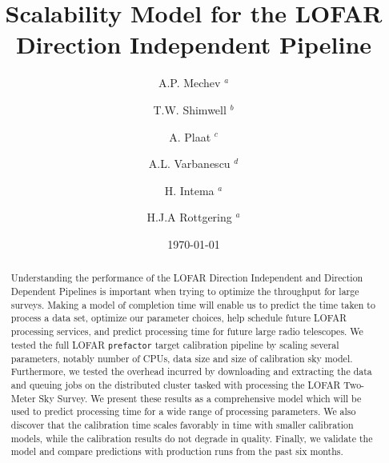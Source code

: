 \documentclass[preprint,5p]{elsarticle}
\begin{document}
\sloppy
{}
\begin{frontmatter}


\title{Scalability Model for the LOFAR Direction Independent Pipeline}%
\author{A.P. Mechev $^a$}

\author{T.W. Shimwell $^b$}%
\author{A. Plaat $^c$}%
\author{A.L. Varbanescu $^d$}
\author{H. Intema $^a$}%
\author{H.J.A Rottgering $^a$}%

\date{\today}%
\address{$^a$ Leiden Observatory, Niels Bohrweg 2, 2333 CA Leiden, the Netherlands}
\address{$^b$ ASTRON, Oude Hoogeveensedijk 4, 7991 PD , The Netherlands }
\address{$^c$ Leiden Institute of Advanced Computer Science, Niels Bohrweg 1, 2333 CA Leiden, the Netherlands}
\address{$^d$ University of Amsterdam, Spui 21, 1012 WX Amsterdam, the Netherlands}

\begin{abstract}
Understanding the performance of the LOFAR Direction Independent and Direction Dependent Pipelines is important when trying to optimize the throughput for large surveys. Making a model of completion time will enable us to predict the time taken to process a data set, optimize our parameter choices, help schedule future LOFAR processing services, and predict processing time for future large radio telescopes. We tested the full LOFAR \texttt{prefactor} target calibration pipeline by scaling several parameters, notably number of CPUs, data size and size of calibration sky model. Furthermore, we tested the overhead incurred by downloading and extracting the data and queuing jobs on the distributed cluster tasked with processing the LOFAR Two-Meter Sky Survey. We present these results as a comprehensive model which will be used to predict processing time for a wide range of processing parameters. We also discover that the calibration time scales favorably in time with smaller calibration models, while the calibration results do not degrade in quality. Finally, we validate the model and compare predictions with production runs from the past six months. 


\end{abstract}
\end{frontmatter}
\end{document}
